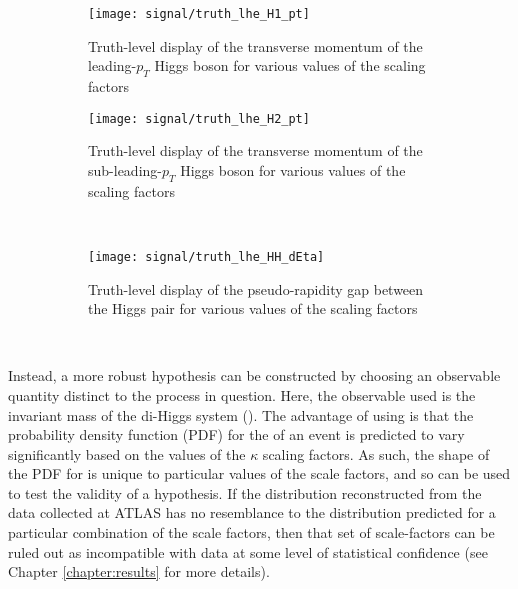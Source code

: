     \begin{figure}[tbh]
        \centering
        \begin{subfigure}{0.48\textwidth}
            \texttt{[image: signal/truth\_lhe\_H1\_pt]}
            \captionsetup{justification=centering} \caption{
                Truth-level display of the transverse momentum of the leading-$p_T$ Higgs boson
                    for various values of the scaling factors
            }
        \end{subfigure}
        \begin{subfigure}{0.48\textwidth}
            \texttt{[image: signal/truth\_lhe\_H2\_pt]}
            \captionsetup{justification=centering} \caption{
                Truth-level display of the transverse momentum of the sub-leading-$p_T$ Higgs boson
                    for various values of the scaling factors
            }
        \end{subfigure} \\

        \begin{subfigure}{0.48\textwidth}
            \texttt{[image: signal/truth\_lhe\_HH\_dEta]}
            \captionsetup{justification=centering} \caption{
                Truth-level display of the pseudo-rapidity gap between the Higgs pair
                    for various values of the scaling factors
            }
        \end{subfigure} \\
        \caption{}
        \label{fig:lhe_truth2}
    \end{figure}

    Instead, a more robust hypothesis can be constructed by choosing an observable quantity distinct to the process in question.
    Here, the observable used is the invariant mass of the di-Higgs system (\mhh).
    The advantage of using \mhh is that the probability density function (PDF) for the \mhh of an event
        is predicted to vary significantly based on the values of the $\kappa$ scaling factors.
    As such, the shape of the PDF for \mhh is unique to particular values of the scale factors, 
        and so can be used to test the validity of a hypothesis.
    If the \mhh distribution reconstructed from the data collected at ATLAS has no resemblance to
        the \mhh distribution predicted for a particular combination of the scale factors,
        then that set of scale-factors can be ruled out as incompatible with data
        at some level of statistical confidence
        (see Chapter \ref{chapter:results} for more details).

